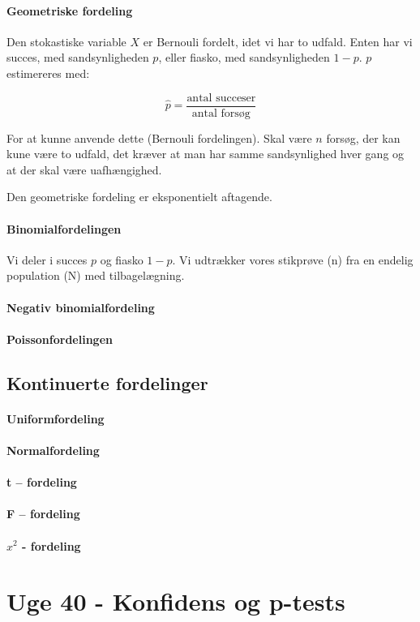 \documentclass{article}
\begin{document}
\paragraph{Geometriske fordeling}
Den stokastiske variable $X$ er Bernouli fordelt, idet vi har to udfald. Enten
har vi succes, med sandsynligheden $p$, eller fiasko, med sandsynligheden $1-p$.
$p$ estimereres med:

$$\hat{p} = \frac{\text{antal succeser}}{\text{antal forsøg}}$$

For at kunne anvende dette (Bernouli fordelingen). Skal være $n$ forsøg, der kan
kune være to udfald, det kræver at man har samme sandsynlighed hver gang og at
der skal være uafhængighed. 

Den geometriske fordeling er eksponentielt aftagende.
\paragraph{Binomialfordelingen}
Vi deler i succes $p$ og fiasko $1-p$. Vi udtrækker vores stikprøve (n) fra en
endelig population (N) med tilbagelægning.


\paragraph{Negativ binomialfordeling}
\paragraph{Poissonfordelingen}

\subsection{Kontinuerte fordelinger}
\paragraph{Uniformfordeling}
\paragraph{Normalfordeling}
\paragraph{t – fordeling}
\paragraph{F – fordeling}
\paragraph{$x^2$  - fordeling}

\newpage

\section{Uge 40 - Konfidens og p-tests}
\end{document}
